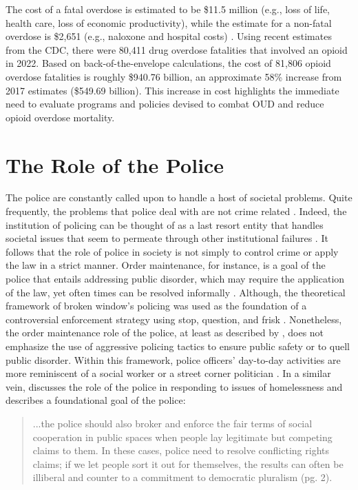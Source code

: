 The cost of a fatal overdose is estimated to be \$11.5 million (e.g., loss of life, health care, loss of economic productivity), while the estimate for a non-fatal overdose is \$2,651 (e.g., naloxone and hospital costs) \parencite{center_for_disease_control_and_prevention_economic_2020}. Using recent estimates from the CDC, there were 80,411 drug overdose fatalities that involved an opioid in 2022. Based on back-of-the-envelope calculations, the cost of 81,806 opioid overdose fatalities is roughly \$940.76 billion, an approximate 58\% increase from 2017 estimates (\$549.69 billion). This increase in cost highlights the immediate need to evaluate programs and policies devised to combat OUD and reduce opioid overdose mortality. 

\section{The Role of the Police}
The police are constantly called upon to handle a host of societal problems. Quite frequently, the problems that police deal with are not crime related \parencite{mastrofski_police_1983, wilson_dilemmas_1968}. Indeed, the institution of policing can be thought of as a last resort entity that handles societal issues that seem to permeate through other institutional failures \parencite{bittner_police_1967}. It follows that the role of police in society is not simply to control crime or apply the law in a strict manner. Order maintenance, for instance, is a goal of the police that entails addressing public disorder, which may require the application of the law, yet often times can be resolved informally \parencite{kelling_broken_1982}. Although, the theoretical framework of broken window's policing was used as the foundation of a controversial enforcement strategy using stop, question, and frisk \parencite{white_federal_2016}. Nonetheless, the order maintenance role of the police, at least as described by \textcite{kelling_broken_1982}, does not emphasize the use of aggressive policing tactics to ensure public safety or to quell public disorder. Within this framework, police officers’ day-to-day activities are more reminiscent of a social worker or a street corner politician \parencite{muir_police_1979}. In a similar vein, \textcite{del_pozo_arrest_2022} discusses the role of the police in responding to issues of homelessness and describes a foundational goal of the police:

\begin{quote}
...the police should also broker and enforce the fair terms of social cooperation in public spaces when people lay legitimate but competing claims to them. In these cases, police need to resolve conflicting rights claims; if we let people sort it out for themselves, the results can often be illiberal and counter to a commitment to democratic pluralism (pg. 2).
\end{quote}

